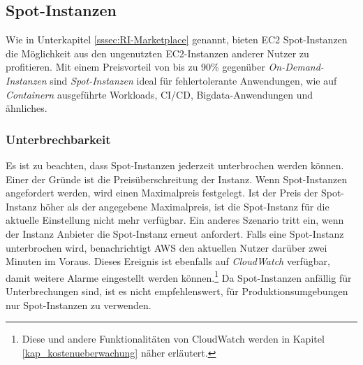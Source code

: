 \subsection{Spot-Instanzen }\label{ssec:Spot-Instances}
Wie in Unterkapitel \ref{sssec:RI-Marketplace} genannt, bieten EC2 Spot-Instanzen die Möglichkeit aus den ungenutzten EC2-Instanzen anderer Nutzer zu profitieren. Mit einem Preisvorteil von bis zu 90\% gegenüber \textit{On-Demand-Instanzen} sind \textit{Spot-Instanzen} ideal für fehlertolerante Anwendungen, wie auf \textit{Containern} ausgeführte Workloads, CI/CD, Bigdata-Anwendungen und ähnliches.

\subsubsection*{Unterbrechbarkeit}
Es ist zu beachten, dass Spot-Instanzen jederzeit unterbrochen werden können. Einer der Gründe ist die Preisüberschreitung der Instanz. Wenn Spot-Instanzen angefordert werden, wird einen Maximalpreis festgelegt. Ist der Preis der Spot-Instanz höher als der angegebene Maximalpreis, ist die Spot-Instanz für die aktuelle Einstellung nicht mehr verfügbar. Ein anderes Szenario tritt ein, wenn der Instanz Anbieter die Spot-Instanz erneut anfordert. Falls eine Spot-Instanz unterbrochen wird, benachrichtigt AWS den aktuellen Nutzer darüber zwei Minuten im Voraus. Dieses Ereignis ist ebenfalls auf \textit{CloudWatch} verfügbar, damit weitere Alarme eingestellt werden können.\footnote{Diese und andere Funktionalitäten von CloudWatch werden in Kapitel \ref{kap_kostenueberwachung} näher erläutert.} Da Spot-Instanzen anfällig für Unterbrechungen sind, ist es nicht empfehlenswert, für Produktionsumgebungen nur Spot-Instanzen zu verwenden.


